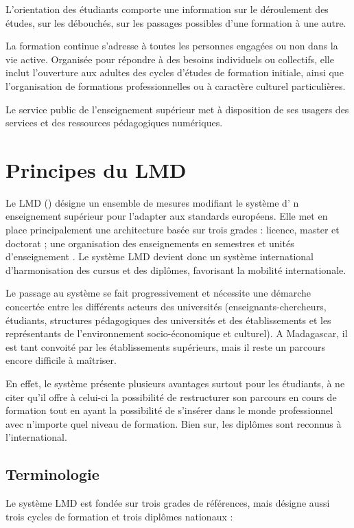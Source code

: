 L'orientation des étudiants comporte une information sur le déroulement des études, sur les débouchés, sur les passages possibles d'une formation à une autre.
\medskip

La formation continue s'adresse à toutes les personnes engagées ou non dans la vie active. Organisée pour répondre à des besoins individuels ou collectifs, elle inclut l'ouverture aux adultes des cycles d'études de formation initiale, ainsi que l'organisation de formations professionnelles ou à caractère
culturel particulières.
\medskip

Le service public de l'enseignement supérieur met à disposition de ses usagers des services et des ressources pédagogiques numériques.

\section{Principes du LMD}
Le LMD () désigne un ensemble de mesures modifiant le système d' n enseignement supérieur pour l'adapter aux standards européens. Elle met en place principalement une architecture basée sur trois grades : licence, master et doctorat ; une organisation des enseignements en semestres et unités d'enseignement \cite{reformeLMD}.
Le système LMD devient donc un système international d'harmonisation des cursus et des
diplômes, favorisant la mobilité internationale.
\medskip

Le passage au  système se fait progressivement et nécessite une démarche concertée entre les différents acteurs des universités (enseignants-chercheurs, étudiants, structures pédagogiques des universités et des établissements et les représentants de l'environnement socio-économique et culturel).  A Madagascar, il est tant convoité par les établissements supérieurs, mais il reste un parcours encore difficile à maîtriser.
\medskip

En effet, le système présente plusieurs avantages surtout pour les étudiants, à ne citer qu'il offre à celui-ci la possibilité de restructurer son parcours en cours de formation tout en ayant la possibilité de s'insérer dans le monde professionnel avec n'importe quel niveau de formation. Bien sur, les diplômes sont reconnus à l'international.

\subsection{Terminologie}
Le système LMD est fondée sur trois grades de références, mais désigne aussi trois cycles de formation et trois diplômes nationaux : 


